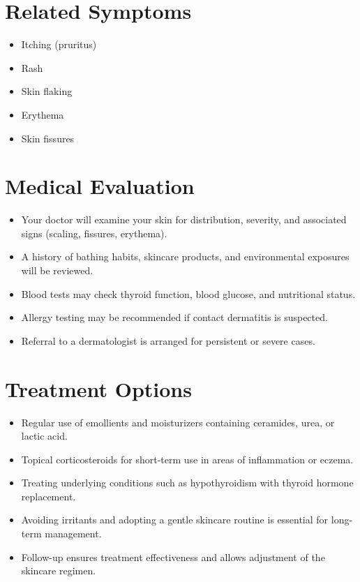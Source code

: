 \section*{Related Symptoms}
\begin{itemize}
  \item Itching (pruritus)
  \item Rash
  \item Skin flaking
  \item Erythema
  \item Skin fissures
\end{itemize}

\section*{Medical Evaluation}
\begin{itemize}
  \item Your doctor will examine your skin for distribution, severity, and associated signs (scaling, fissures, erythema).
  \item A history of bathing habits, skincare products, and environmental exposures will be reviewed.
  \item Blood tests may check thyroid function, blood glucose, and nutritional status.
  \item Allergy testing may be recommended if contact dermatitis is suspected.
  \item Referral to a dermatologist is arranged for persistent or severe cases.
\end{itemize}

\section*{Treatment Options}
\begin{itemize}
  \item Regular use of emollients and moisturizers containing ceramides, urea, or lactic acid.
  \item Topical corticosteroids for short-term use in areas of inflammation or eczema.
  \item Treating underlying conditions such as hypothyroidism with thyroid hormone replacement.
  \item Avoiding irritants and adopting a gentle skincare routine is essential for long-term management.
  \item Follow-up ensures treatment effectiveness and allows adjustment of the skincare regimen.
\end{itemize}

